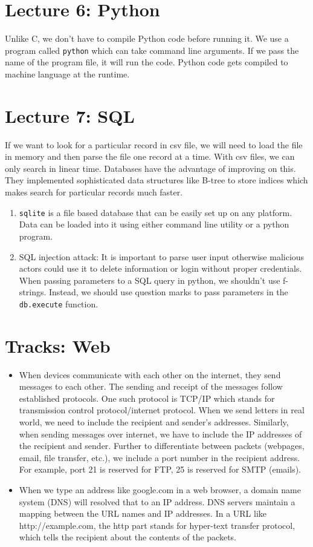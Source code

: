 \documentclass[11pt]{article}
\begin{document}
\section*{Lecture 6: Python}
Unlike C, we don't have to compile Python code before running it. We use a program called \texttt{python} which can take command line arguments. If we pass the name of the program file, it will run the code. Python code gets compiled to machine language at the runtime. 	
\section*{Lecture 7: SQL}
If we want to look for a particular record in csv file, we will need to load the file in memory and then parse the file one record at a time. With csv files, we can only search in linear time. Databases have the advantage of improving on this. They implemented sophisticated data structures like B-tree to store indices which makes search for particular records much faster. 

\begin{enumerate}
	\item \texttt{sqlite} is a file based database that can be easily set up on any platform. Data can be loaded into it using either command line utility or a python program. 
	\item SQL injection attack: It is important to parse user input otherwise malicious actors could use it to delete information or login without proper credentials. When passing parameters to a SQL query in python, we shouldn't use f-strings. Instead, we should use question marks to pass parameters in the \texttt{db.execute} function. 
\end{enumerate}

\section*{Tracks: Web}
\begin{itemize}
	\item When devices communicate with each other on the internet, they send messages to each other. The sending and receipt of the messages follow established protocols. One such protocol is TCP/IP which stands for transmission control protocol/internet protocol. When we send letters in real world, we need to include the recipient and sender's addresses. Similarly, when sending messages over internet, we have to include the IP addresses of the recipient and sender. Further to differentiate between packets (webpages, email, file transfer, etc.), we include a port number in the recipient address. For example, port 21 is reserved for FTP, 25 is reserved for SMTP (emails).
	\item When we type an address like google.com in a web browser, a domain name system (DNS) will resolved that to an IP address. DNS servers maintain a mapping between the URL names and IP addresses. In a URL like http://example.com, the http part stands for hyper-text transfer protocol, which tells the recipient about the contents of the packets. 
\end{itemize}



\end{document}
